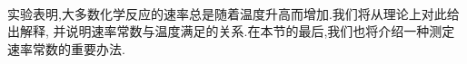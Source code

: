 \documentclass{ctexart}
\begin{document}
\pagestyle{plain}
\noindent{}\vspace{15pt}\\
\indent 实验表明,大多数化学反应的速率总是随着温度升高而增加.我们将从理论上对此给出解释,%
并说明速率常数与温度满足的关系.在本节的最后,我们也将介绍一种测定速率常数的重要办法.\vspace{12pt}
\end{document}
